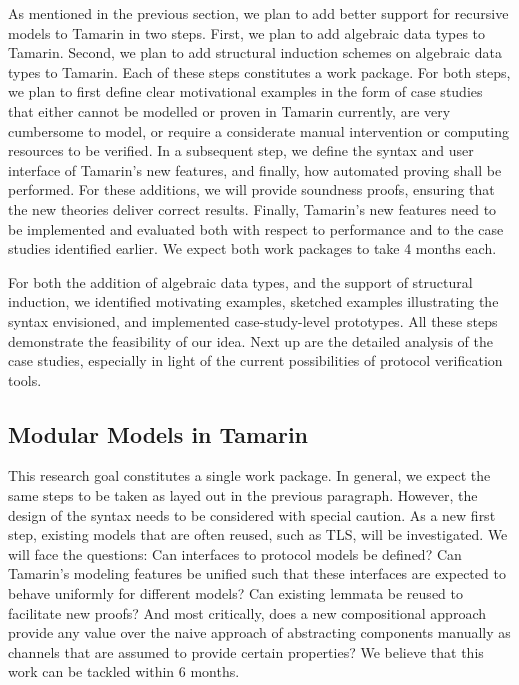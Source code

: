 \documentclass{article}
\begin{document}
As mentioned in the previous section, we plan to add better support for recursive models to Tamarin in two steps.
First, we plan to add algebraic data types to Tamarin.
Second, we plan to add structural induction schemes on algebraic data types to Tamarin.
Each of these steps constitutes a work package.
For both steps, we plan to first define clear motivational examples in the form of case studies that either cannot be modelled or proven in Tamarin currently, are very cumbersome to model, or require a considerate manual intervention or computing resources to be verified.
In a subsequent step, we define the syntax and user interface of Tamarin's new features, and finally, how automated proving shall be performed.
For these additions, we will provide soundness proofs, ensuring that the new theories deliver correct results.
Finally, Tamarin's new features need to be implemented and evaluated both with respect to performance and to the case studies identified earlier.
We expect both work packages to take 4 months each.

For both the addition of algebraic data types, and the support of structural induction, we identified motivating examples, sketched examples illustrating the syntax envisioned, and implemented case-study-level prototypes.
All these steps demonstrate the feasibility of our idea.
Next up are the detailed analysis of the case studies, especially in light of the current possibilities of protocol verification tools.

\subsection{Modular Models in Tamarin}
This research goal constitutes a single work package.
In general, we expect the same steps to be taken as layed out in the previous paragraph.
However, the design of the syntax needs to be considered with special caution.
As a new first step, existing models that are often reused, such as TLS, will be investigated.
We will face the questions: Can interfaces to protocol models be defined?
Can Tamarin's modeling features be unified such that these interfaces are expected to behave uniformly for different models?
Can existing lemmata be reused to facilitate new proofs?
And most critically, does a new compositional approach provide any value over the naive approach of abstracting components manually as channels that are assumed to provide certain properties?
We believe that this work can be tackled within 6 months.
\end{document}
